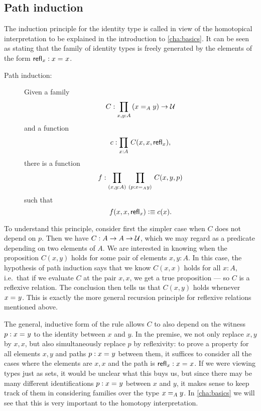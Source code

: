 \subsection{Path induction}

The induction principle for the identity type is called 
%
%
in view of the homotopical interpretation to be explained in  the introduction to \autoref{cha:basics}.  It can be seen as stating that the family of identity types is freely generated by the elements of the form $\refl{x}: \id{x}{x}$.

\begin{description}
\item[Path induction:] 
  Given a family 
  \[ C : \prd{x,y:A} (\id[A]{x}{y}) \to \UU \]
  and a function
  \[ c :  \prd{x:A} C(x,x,\refl{x}),\]
  there is a function
  \[ f : \prd{x,y:A}{p:\id[A]{x}{y}} C(x,y,p) \]
  such that 
  \[ f(x,x,\refl{x}) \defeq c(x). \]
\end{description}

To understand this principle, consider first the simpler case when $C$
does not depend on $p$.  Then we have $C:A\to A\to \UU$, which we may
regard as a predicate depending on two elements of $A$.  We are
interested in knowing when the proposition $C(x,y)$ holds for some pair
of elements $x,y:A$.  In this case, the hypothesis of path induction
says that we know $C(x,x)$ holds for all $x:A$, i.e.\ that if we
evaluate $C$ at the pair $x, x$, we get a true proposition --- so $C$ is
a reflexive relation.  The conclusion then tells us that $C(x,y)$ holds
whenever $\id{x}{y}$.  This is exactly the more general recursion principle
for reflexive relations mentioned above.

The general, inductive form of the rule allows $C$ to also depend on the witness $p:\id{x}{y}$ to the identity between $x$ and $y$.  In the premise, we not only replace $x, y$ by $x,x$, but also simultaneously replace $p$ by reflexivity: to prove a property for all elements $x,y$ and paths $p : \id{x}{y}$ between them, it suffices to consider all the cases where the elements are $x,x$ and the path is $\refl{x}: \id{x}{x}$.  If we were viewing types just as sets, it would be unclear what this buys us, but since there may be many different identifications $p : \id{x}{y}$ between $x$ and $y$, it makes sense to keep track of them in considering families over the type $\id[A]{x}{y}$.
In \autoref{cha:basics} we will see that this is very important to the homotopy interpretation.

